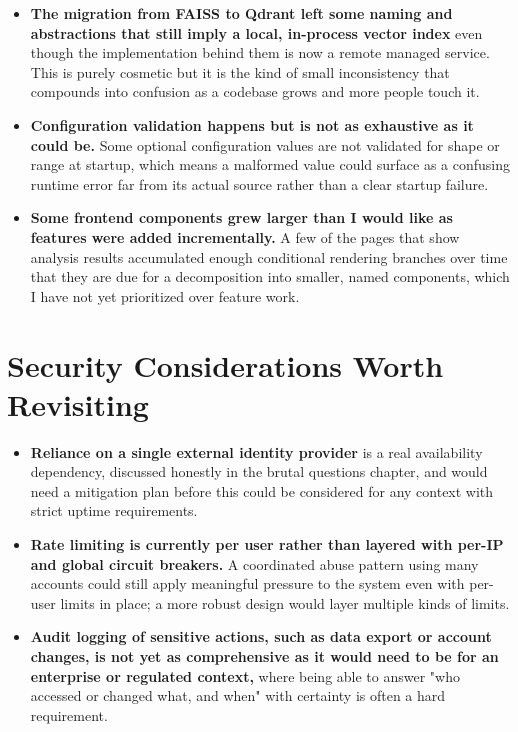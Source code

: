 \documentclass[11pt,a4paper]{report}
\begin{document}
\begin{itemize}[leftmargin=*]
\item \textbf{The migration from FAISS to Qdrant left some naming and abstractions that still imply a local, in-process vector index} even though the implementation behind them is now a remote managed service. This is purely cosmetic but it is the kind of small inconsistency that compounds into confusion as a codebase grows and more people touch it.

\item \textbf{Configuration validation happens but is not as exhaustive as it could be.} Some optional configuration values are not validated for shape or range at startup, which means a malformed value could surface as a confusing runtime error far from its actual source rather than a clear startup failure.

\item \textbf{Some frontend components grew larger than I would like as features were added incrementally.} A few of the pages that show analysis results accumulated enough conditional rendering branches over time that they are due for a decomposition into smaller, named components, which I have not yet prioritized over feature work.
\end{itemize}

\section{Security Considerations Worth Revisiting}

\begin{itemize}[leftmargin=*]
\item \textbf{Reliance on a single external identity provider} is a real availability dependency, discussed honestly in the brutal questions chapter, and would need a mitigation plan before this could be considered for any context with strict uptime requirements.

\item \textbf{Rate limiting is currently per user rather than layered with per-IP and global circuit breakers.} A coordinated abuse pattern using many accounts could still apply meaningful pressure to the system even with per-user limits in place; a more robust design would layer multiple kinds of limits.

\item \textbf{Audit logging of sensitive actions, such as data export or account changes, is not yet as comprehensive as it would need to be for an enterprise or regulated context,} where being able to answer "who accessed or changed what, and when" with certainty is often a hard requirement.
\end{itemize}
\end{document}
